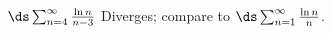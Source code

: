 {$\ds \sum_{n=4}^\infty \frac{\ln n}{n-3}$
}
{Diverges; compare to $\ds \sum_{n=1}^\infty \frac {\ln n}{n}$.
}